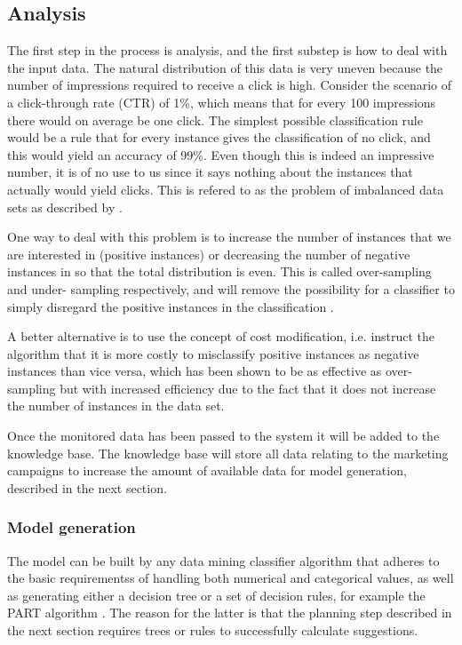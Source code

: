 \documentclass[10pt,twocolumn]{article}
\begin{document}
\subsection{Analysis}
The first step in the process is analysis, and the first substep is how to deal with the input data. The natural distribution of this data is very uneven because the number of impressions required to receive a click is high. Consider the scenario of a click-through rate (CTR) of 1\%, which means that for every 100 impressions there would on average be one click. The simplest possible classification rule would be a rule that for every instance gives the classification of no click, and this would yield an accuracy of 99\%. Even though this is indeed an impressive number, it is of no use to us since it says nothing about the instances that actually would yield clicks. This is refered to as the problem of imbalanced data sets as described by \citet{Chawla2004}.

One way to deal with this problem is to increase the number of instances that we are interested in (positive instances) or decreasing the number of negative instances in so that the total distribution is even. This is called over-sampling and under- sampling respectively, and will remove the possibility for a classifier to simply disregard the positive instances in the classification \citep{Chawla2004, Japkowicz2002}.

A better alternative is to use the concept of cost modification, i.e. instruct the algorithm that it is more costly to misclassify positive instances as negative instances than vice versa, which has been shown to be as effective as over-sampling but with increased efficiency \citep{Chawla2004, Japkowicz2002} due to the fact that it does not increase the number of instances in the data set.

Once the monitored data has been passed to the system it will be added to the knowledge base. The knowledge base will store all data relating to the marketing campaigns to increase the amount of available data for model generation, described in the next section.

\subsubsection{Model generation}
The model can be built by any data mining classifier algorithm that adheres to the basic requirementss of handling both numerical and categorical values, as well as generating either a decision tree or a set of decision rules, for example the PART algorithm \citep{Frank1998}. The reason for the latter is that the planning step described in the next section requires trees or rules to successfully calculate suggestions.
\end{document}

